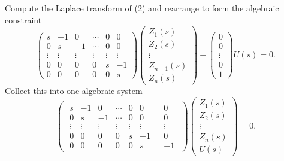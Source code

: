 Compute the Laplace transform of (2) and rearrange to form the algebraic constraint
\[
  \begin{pmatrix}
    s      & -1     & 0      & \cdots & 0      & 0\\
    0      &  s     & -1     & \cdots & 0      & 0\\
    \vdots & \vdots & \vdots & \vdots & \vdots & \vdots\\
    0      &  0     & 0      & 0      & s      & -1\\
    0      &  0     & 0      & 0      & 0      & s
  \end{pmatrix}
  \begin{pmatrix}
    Z_1(s)\\
    Z_2(s)\\
    \vdots\\
    Z_{n-1}(s)\\
    Z_n(s)
  \end{pmatrix}
  -
  \begin{pmatrix} 0 \\ 0 \\ \vdots \\ 0 \\ 1 \end{pmatrix}
  U(s)
  =
  0.
\]
Collect this into one algebraic system
\[
  \left(
  \begin{array}{l|l}
    \begin{array}{cccccc}
      s      & -1     & 0      & \cdots & 0      & 0\\
      0      &  s     & -1     & \cdots & 0      & 0\\
      \vdots & \vdots & \vdots & \vdots & \vdots & \vdots\\
      0      &  0     & 0      & 0      & s      & -1\\
      0      &  0     & 0      & 0      & 0      & s
    \end{array}
    &
    \begin{array}{c} 0 \\ 0 \\ \vdots \\ 0 \\ -1 \end{array}
  \end{array}
  \right)
  \begin{pmatrix}
    Z_1(s)\\
    Z_2(s)\\
    \vdots\\
    Z_n(s)\\
    U(s)
  \end{pmatrix}
  =
  0.
\]
